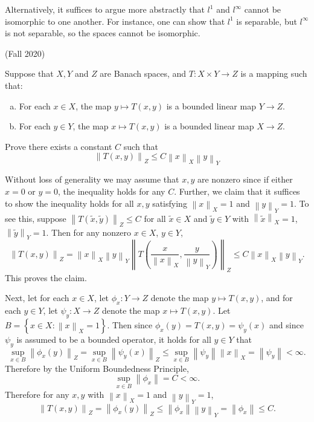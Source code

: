 \documentclass[answers]{exam}
\theoremstyle{problemstyle}
\newcommand{\norm}[1]{\left\lVert#1\right\rVert} %
\newcommand{\1}[1]{\textbf{1}_{\left[#1\right]}} %
\begin{document}
\begin{questions}
\begin{solution}
    Alternatively, it suffices to argue more abstractly that $l^1$ and $l^\infty$ cannot be isomorphic to one another. For instance, one can show that $l^1$ is separable, but $l^\infty$ is not separable, so the spaces cannot be isomorphic.
\end{solution}

\question (Fall 2020)

Suppose that $X,Y$ and $Z$ are Banach spaces, and $T:X\times Y\to Z$ is a mapping such that:
\begin{enumerate}[(a)]
\item For each $x\in X$, the map $y\mapsto T(x,y)$ is a bounded linear map $Y\to Z$.
\item For each $y\in Y$, the map $x\mapsto T(x,y)$ is a bounded linear map $X\to Z$.
\end{enumerate}
Prove there exists a constant $C$ such that
\begin{equation*}
\norm{T(x,y)}_{Z}\leq C \norm{x}_{X}\norm{y}_{Y}
\end{equation*}

\begin{solution}
  Without loss of generality we may assume that $x,y$ are nonzero since if either $x=0$ or $y=0$, the inequality holds for any $C$. Further, we claim that it suffices to show the inequality holds for all $x,y$ satisfying $\norm{x}_{X}=1$ and $\norm{y}_{Y}=1.$ To see this, suppose $\norm{T(\tilde{x},\tilde{y})}_{Z}\leq C$ for all $\tilde{x}\in X$ and $\tilde{y}\in Y$ with $\norm{\tilde{x}}_{X}=1$, $\norm{\tilde{y}}_{Y}=1$. Then for any nonzero $x\in X$, $y\in Y$,
  \begin{equation*}
    \norm{T(x,y)}_{Z}= \norm{x}_{X}\norm{y}_{Y}\norm{T \left( \frac{x}{\norm{x}_{X}},\frac{y}{\norm{y}_{Y}} \right)}_{Z} \leq C \norm{x}_{X}\norm{y}_{Y}.
  \end{equation*}
  This proves the claim.

  Next, let for each $x\in X$, let $\phi_{x}:Y\to Z$ denote the map $y\mapsto T(x,y)$, and for each $y\in Y$, let $\psi_{y}:X\to Z$ denote the map $x\mapsto T(x,y)$. Let $B= \left\{ x\in X: \norm{x}_{X}=1 \right\}$. Then since $\phi_{x}(y)=T(x,y)=\psi_{y}(x)$ and since $\psi_{y}$ is assumed to be a bounded operator, it holds for all $y\in Y$ that
  \begin{equation*}
    \sup_{x\in B}\norm{\phi_{x}(y)}_{Z} = \sup_{x\in B}\norm{\psi_{y}(x)}_{Z} \leq \sup_{x\in B}\norm{\psi_{y}} \norm{x}_{X} = \norm{\psi_{y}} <\infty.
  \end{equation*}
  Therefore by the Uniform Boundedness Principle,
  \begin{equation*}
    \sup_{x\in B}\norm{\phi_{x}}= C <\infty.
  \end{equation*}
  Therefore for any $x,y$ with $\norm{x}_{X}=1$ and $\norm{y}_{Y}=1$,
  \begin{equation*}
    \norm{T(x,y)}_{Z} = \norm{\phi_{x}(y)}_{Z}\leq \norm{\phi_{x}}\norm{y}_{Y} = \norm{\phi_{x}} \leq C.
  \end{equation*}
\end{solution}


\end{questions}
\end{document}
